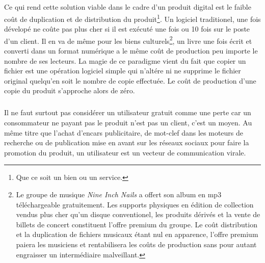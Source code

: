 \documentclass[11pt, a4paper ]{article}
\begin{document}
\begin{spacing}{1.5}
\subparagraph{}
Ce qui rend cette solution viable dans le cadre d'un produit digital est le faible coût de duplication et de distribution du produit\footnote{Que ce soit un bien ou un service.}. Un logiciel traditionel, une fois dévelopé ne coûte pas plus cher si il est exécuté une fois ou 10 fois sur le poste d'un client. Il en va de même pour les biens culturels\footnote{Le groupe de musique \emph{Nine Inch Nails} a offert son album en mp3 téléchargeable gratuitement. Les supports physiques en édition de collection vendus plus cher qu'un disque conventionel, les produits dérivés et la vente de billets de concert constituent l'offre premium du groupe. Le coût distribution et la duplication de fichiers musicaux étant nul en apparence, l'offre premium paiera les musiciens et rentabilisera les coûts de production sans pour autant engraisser un intermédiaire malveillant.}, un livre une fois écrit et converti dans un format numérique a le même coût de production peu importe le nombre de ses lecteurs. La magie de ce paradigme vient du fait que copier un fichier est une opération logiciel simple qui n'altére ni ne supprime le fichier original quelqu'en soit le nombre de copie effectuée. Le coût de production d'une copie du produit s'approche alors de zéro.

\subparagraph{}
Il ne faut surtout pas considérer un utilisateur gratuit comme une perte car un consommateur ne payant pas le produit n'est pas un client, c'est un moyen. Au même titre que l'achat d'encars publicitaire, de mot-clef dans les moteurs de recherche ou de publication mise en avant sur les réseaux sociaux pour faire la promotion du produit, un utilisateur est un vecteur de communication virale.



\end{spacing}
\end{document}
